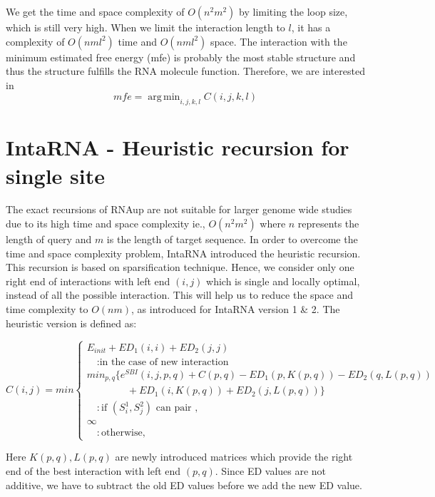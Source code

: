 \documentclass[twoside,a4paper]{report}
\DeclareMathOperator*{\argmin}{arg\,min}
\numberwithin{equation}{section}
\begin{document}
	We get the time and space complexity of $O(n^2m^2)$ by limiting the loop size, which is still very high. When we limit the interaction length to $l$, it has a complexity of $O(nml^2)$ time and $O(nml^2)$ space. The interaction with the minimum estimated free energy (mfe) is probably the most stable structure and thus the structure fulfills the RNA molecule function. Therefore, we are interested in \\
	
	 \begin{equation*}
	mfe = \argmin_{i,j,k,l} C(i,j,k,l)
	\end{equation*}

	
	
	\section{IntaRNA -  Heuristic recursion for single site}
	
	The exact recursions of RNAup are not suitable for larger genome wide studies due to its high time and space complexity ie., $O(n^2m^2)$	where $n$ represents the length of query and $m$ is the length of target sequence. In order to overcome the time and space complexity problem, IntaRNA introduced the heuristic recursion. This recursion is based on sparsification technique. Hence, we consider only one right end of interactions with left end $(i, j)$  which is single and locally optimal, instead of all the possible interaction. This will help us to reduce the space and time complexity to $O(nm)$, as introduced for IntaRNA version 1 \& 2. The heuristic version is defined as:
	
	\begin{equation}
	C(i,j) =  min \begin{cases}
	E_{init} + ED_1(i, i) + ED_2(j, j) \\
	\quad 	: \text{in the case of new interaction}\\
	min_{p,q}\{ e^{SBI}(i,j,p,q)+ C(p,q) - ED_1(p,K(p,q)) - ED_2(q,L(p,q))\\
	\quad \quad \quad \quad + ED_1(i,K(p,q)) + ED_2(j,L(p,q))\} \\
	\quad 	: \text{if $(S_i^1 , S_j^2 )$ can pair },\\
	\infty \\
	\quad : \text{otherwise},
	\end{cases}
	\end{equation}
	
	Here $K(p,q) , L(p,q)$ are newly introduced matrices which provide the right end of the best interaction with left end $(p,q)$. Since ED values are not additive, we have to subtract the old ED values before we add the new ED value.\\
	
\end{document}
